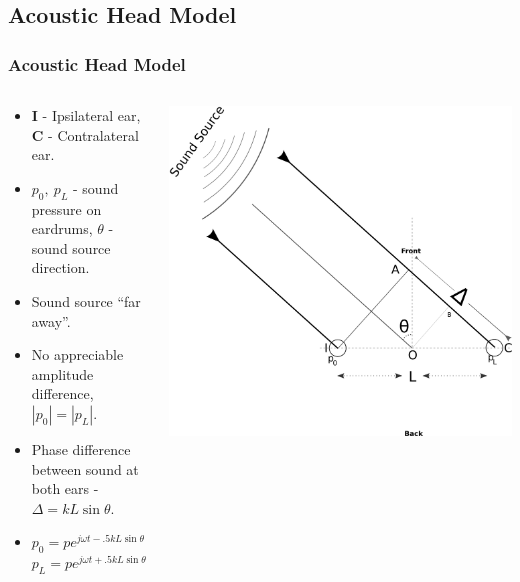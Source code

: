 \documentclass{beamer}
\begin{document}
\subsection{Acoustic Head Model}
\begin{frame}[t]
 \frametitle{Acoustic Head Model}
 \begin{columns}
     \begin{column}{.5\textwidth}
    \small
    \flushleft
     \begin{itemize}
      \item<1> \textbf{I} - Ipsilateral ear, \textbf{C} - Contralateral ear.
      \item<1>  $p_0,\ p_L$ - sound pressure on eardrums,
      $\theta$ - sound source direction.
     \end{itemize}
     
     \begin{itemize}
      \item<2> Sound source ``far away''.
      \item<2> No appreciable amplitude difference, $|p_0|=|p_L|$.
      \item<2> Phase difference between sound at both ears - $\Delta=kL\sin\theta$.
      \item<3> $p_0=pe^{j\omega t -.5kL\sin\theta}$\\ $p_L=pe^{j\omega t +.5kL\sin\theta}$
      \end{itemize}

    \end{column}
    
 \begin{column}{0.5\textwidth}
    \includegraphics[width = 6 cm]{Diagrams/Presentation/acousticheadmodelold.png}\\
    \end{column}

    \end{columns}
\end{frame}
\end{document}
